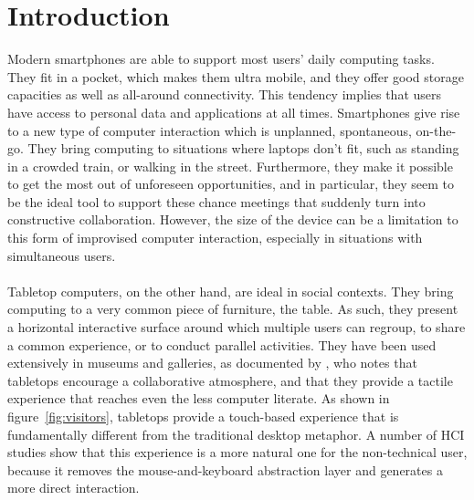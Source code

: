 

%

\chapter{Introduction}
\label{introduction}

Modern smartphones are able to support most users' daily computing tasks.
They fit in a pocket, which makes them ultra mobile, and they offer good storage capacities as well as all-around connectivity.
This tendency implies that users have access to personal data and applications at all times.
Smartphones give rise to a new type of computer interaction which is unplanned, spontaneous, on-the-go.
They bring computing to situations where laptops don't fit, such as standing in a crowded train, or walking in the street.
Furthermore, they make it possible to get the most out of unforeseen opportunities, and in particular, they seem to be the ideal tool to support these chance meetings that suddenly turn into constructive collaboration.
However, the size of the device can be a limitation to this form of improvised computer interaction, especially in situations with simultaneous users. 
\\\\
Tabletop computers, on the other hand, are ideal in social contexts.
They bring computing to a very common piece of furniture, the table.
As such, they present a horizontal interactive surface around which multiple users can regroup, to share a common experience, or to conduct parallel activities.
They have been used extensively in museums and galleries, as documented by \cite{Geller:2006:exhibits}, who notes that tabletops encourage a collaborative atmosphere, and that they provide a tactile experience that reaches even the less computer literate.
As shown in figure~\ref{fig:visitors}, tabletops provide a touch-based experience that is fundamentally different from the traditional desktop metaphor.
A number of HCI studies show that this experience is a more natural one for the non-technical user, because it removes the mouse-and-keyboard abstraction layer and generates a more direct interaction.

